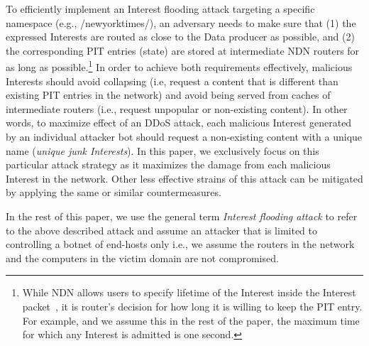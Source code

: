 To efficiently implement an Interest flooding attack targeting a specific namespace (e.g., /newyorktimes/), an adversary needs to make sure that (1) the expressed Interests are routed as close to the Data producer as possible, and (2) the corresponding PIT entries (state) are stored at intermediate NDN routers for as long as possible.\footnote{While NDN allows users to specify lifetime of the Interest inside the Interest packet~\cite{ndn-conext,ndn-tr}, it is router's decision for how long it is willing to keep the PIT entry.  For example, and we assume this in the rest of the paper, the maximum time for which any Interest is admitted is one second.}
In order to achieve both requirements effectively, malicious Interests should avoid collapsing (i.e, request a content that is different than existing PIT entries in the network) and avoid being served from caches of intermediate routers (i.e., request unpopular or non-existing content). In other words, to maximize effect of an DDoS attack, each malicious Interest generated by an individual attacker bot should request a non-existing content with a unique name (\emph{unique junk Interests}). In this paper, we exclusively focus on this particular attack strategy as it maximizes the damage from each malicious Interest in the network. Other less effective strains of this attack can be mitigated by applying the same or similar countermeasures.  

In the rest of this paper, we use the general term \emph{Interest flooding attack} to refer to the above described attack and assume an attacker that is limited to controlling a botnet of end-hosts only i.e., we assume the routers in the network and the computers in the victim domain are not compromised.




